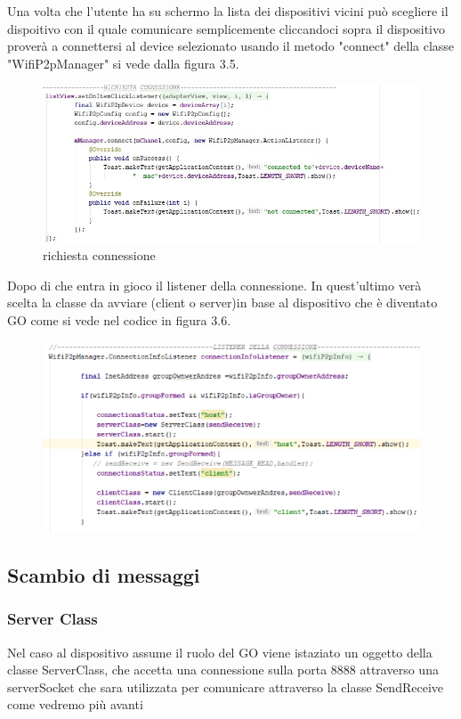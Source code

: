 Una volta che l'utente ha su schermo la lista dei dispositivi
vicini può scegliere il dispoitivo con il quale comunicare
semplicemente cliccandoci sopra il dispositivo proverà a 
connettersi al device selezionato usando il metodo "connect" 
della classe "WifiP2pManager" si vede dalla figura 3.5.
\begin{figure}
    \caption{richiesta connessione}
    \includegraphics[width=1\columnwidth]{imgs/Connect.png}
\end{figure}

Dopo di che entra in gioco il listener della connessione.
In quest'ultimo verà scelta la classe da avviare 
(client o server)in base al dispositivo che è 
diventato GO come si vede nel codice in figura 3.6.

\begin{figure}
    \caption{}
    \includegraphics[width=1\columnwidth]{imgs/listenerConeessione.png}
\end{figure}

\subsection{Scambio di messaggi}
\subsubsection{Server Class}
Nel caso al dispositivo assume il ruolo del GO
viene istaziato un oggetto della  classe ServerClass,
che accetta una connessione sulla porta 8888 
attraverso una serverSocket che sara utilizzata per comunicare 
attraverso la classe SendReceive come vedremo più avanti 

